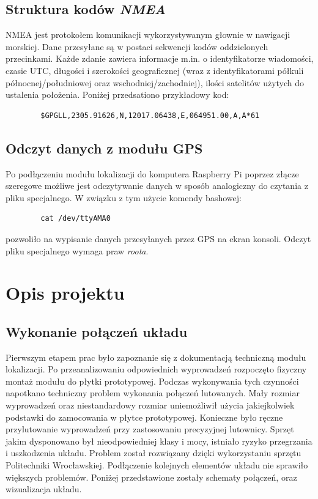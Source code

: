 \documentclass{article}
\begin{document}
	\subsection{Struktura kodów \textit{NMEA}}
		NMEA jest protokołem komunikacji wykorzystywanym głownie w nawigacji morskiej. Dane przesyłane są w postaci sekwencji kodów oddzielonych przecinkami. Każde zdanie zawiera informacje m.in. o identyfikatorze wiadomości, czasie UTC, długości i szerokości geograficznej (wraz z identyfikatorami półkuli północnej/południowej oraz wschodniej/zachodniej),  ilości satelitów użytych do ustalenia położenia. Poniżej przedsationo przykładowy kod:
		\begin{verbatim}
		$GPGLL,2305.91626,N,12017.06438,E,064951.00,A,A*61
		\end{verbatim}
    \subsection{Odczyt danych z modułu GPS }    
	   Po podłączeniu modułu lokalizacji do komputera Raspberry Pi poprzez złącze szeregowe możliwe jest odczytywanie danych w sposób analogiczny do czytania z pliku specjalnego. W związku z tym użycie komendy bashowej:
	   	\begin{verbatim}
	   	cat /dev/ttyAMA0
	   	\end{verbatim} 
	   	pozwoliło na wypisanie danych przesyłanych przez GPS na ekran konsoli. Odczyt pliku specjalnego wymaga praw \textit{roota}.
\section{Opis projektu}
	\subsection{Wykonanie połączeń układu}
		Pierwszym etapem prac było zapoznanie się z dokumentacją techniczną modułu lokalizacji. Po przeanalizowaniu odpowiednich wyprowadzeń rozpoczęto fizyczny montaż modułu do płytki prototypowej. Podczas wykonywania tych czynności napotkano techniczny problem wykonania połączeń lutowanych. Mały rozmiar wyprowadzeń oraz niestandardowy rozmiar uniemożliwił użycia jakiejkolwiek podstawki do zamocowania w płytce prototypowej. Konieczne było ręczne przylutowanie wyprowadzeń przy zastosowaniu precyzyjnej lutownicy. Sprzęt jakim dysponowano był nieodpowiedniej klasy i mocy, istniało ryzyko przegrzania i uszkodzenia układu. Problem został rozwiązany dzięki wykorzystaniu sprzętu Politechniki Wrocławskiej. Podłączenie kolejnych elementów układu nie sprawiło większych problemów. Poniżej przedstawione zostały schematy połączeń, oraz wizualizacja układu.
			    
\end{document}
